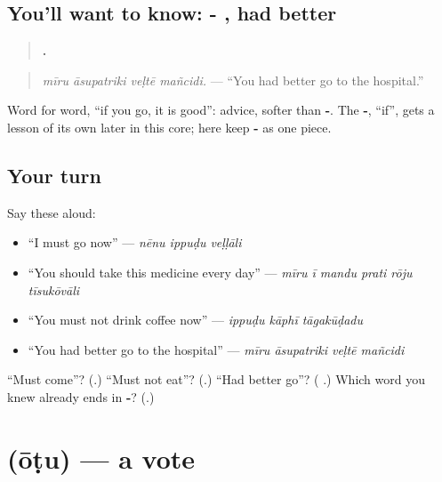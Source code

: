 \subsection*{You'll want to know: - , had better}
\begin{quote}
\textbf{   .}
\end{quote}

\begin{quote}
\emph{mīru āsupatriki veḷtē mañcidi.} — \textquotedblleft{}You had better go to the hospital.\textquotedblright{}
\end{quote}

Word for word, \textquotedblleft{}if you go, it is good\textquotedblright{}: advice, softer than \textbf{-}. The \textbf{-}, \textquotedblleft{}if\textquotedblright{}, gets a lesson of its own later in this core; here keep \textbf{- } as one piece.

\subsection*{Your turn}
Say these aloud:

\begin{itemize}
\raggedright
  \item \textquotedblleft{}I must go now\textquotedblright{} — \emph{nēnu ippuḍu veḷḷāli}
  \item \textquotedblleft{}You should take this medicine every day\textquotedblright{} — \emph{mīru ī mandu prati rōju tīsukōvāli}
  \item \textquotedblleft{}You must not drink coffee now\textquotedblright{} — \emph{ippuḍu kāphī tāgakūḍadu}
  \item \textquotedblleft{}You had better go to the hospital\textquotedblright{} — \emph{mīru āsupatriki veḷtē mañcidi}
\end{itemize}

\begin{tcolorbox}[breakable,colback=teal!4,colframe=teal!35!black,title={Before you move on}]
\textquotedblleft{}Must come\textquotedblright{}? (\textbf{}.) \textquotedblleft{}Must not eat\textquotedblright{}? (\textbf{}.) \textquotedblleft{}Had better go\textquotedblright{}? (\textbf{ }.) Which word you knew already ends in \textbf{-}? (\textbf{}.)
\end{tcolorbox}
\section[\texorpdfstring{\te{ఓటు} (ōṭu)}{ఓటు (ōṭu)}]{ (ōṭu) — a vote}

